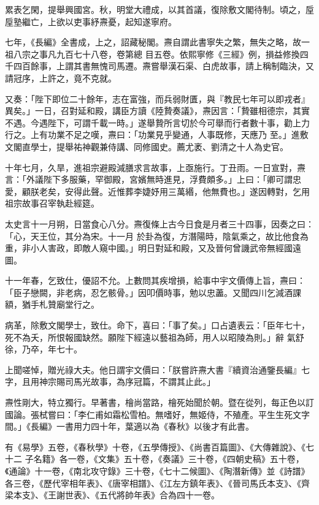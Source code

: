 \begin{pinyinscope}
 累表乞閑，提舉興國宮。秋，明堂大禮成，以其首議，復除敷文閣待制。頃之，垕垕塾繼亡，上欲以吏事紓燾憂，起知遂寧府。



 七年，《長編》全書成，上之，詔藏秘閣。燾自謂此書寧失之繁，無失之略，故一祖八宗之事凡九百七十八卷，卷第總
 目五卷。依熙寧修《三經》例，損益修換四千四百餘事，上謂其書無愧司馬遷。燾嘗舉漢石渠、白虎故事，請上稱制臨決，又請冠序，上許之，竟不克就。



 又奏：「陛下即位二十餘年，志在富強，而兵弱財匱，與『教民七年可以即戎者』異矣。」一日，召對延和殿，講臣方讀《陸贄奏議》，燾因言：「贄雖相德宗，其實不遇。今遇陛下，可謂千載一時。」遂舉贄所言切於今可舉而行者數十事，勸上力行之。上有功業不足之嘆，燾曰：「功業見乎變通，人事既修，天應乃
 至。」進敷文閣直學士，提舉祐神觀兼侍講、同修國史。薦尤袤、劉清之十人為史官。



 十年七月，久旱，進祖宗避殿減膳求言故事，上亟施行。丁丑雨。一日宣對，燾言：「外議陛下多服藥，罕御殿，宮嬪無時進見，浮費頗多。」上曰：「卿可謂忠愛，顧朕老矣，安得此聲。近惟葬李婕妤用三萬緡，他無費也。」遂因轉對，乞用祖宗故事召宰執赴經筵。



 太史言十一月朔，日當食心八分。燾復條上古今日食是月者三十四事，因奏之曰：「心，天王位，其分為宋。十一月
 於卦為復，方潛陽時，陰氣乘之，故比他食為重，非小人害政，即敵人窺中國。」明日對延和殿，又及晉何曾譏武帝無經國遠圖。



 十一年春，乞致仕，優詔不允。上數問其疾增損，給事中宇文價傳上旨，燾曰：「臣子戀闕，非老病，忍乞骸骨。」因叩價時事，勉以忠藎。又聞四川乞減酒課額，猶手札贊廟堂行之。



 病革，除敷文閣學士，致仕。命下，喜曰：「事了矣。」口占遺表云：「臣年七十，死不為夭，所恨報國缺然。願陛下經遠以藝祖為師，用人以昭陵為則。」辭
 氣舒徐，乃卒，年七十。



 上聞嗟悼，贈光祿大夫。他日謂宇文價曰：「朕嘗許燾大書『續資治通鑒長編』七字，且用神宗賜司馬光故事，為序冠篇，不謂其止此。」



 燾性剛大，特立獨行。早著書，檜尚當路，檜死始聞於朝。暨在從列，每正色以訂國論。張栻嘗曰：「李仁甫如霜松雪柏。無嗜好，無姬侍，不殖產。平生生死文字間。」《長編》一書用力四十年，葉適以為《春秋》以後才有此書。



 有《易學》五卷，《春秋學》十卷，《五學傳授》、《尚書百篇圖》、《大傳雜說》、《七十二
 子名籍》各一卷，《文集》五十卷，《奏議》三十卷，《四朝史稿》五十卷，《通論》十一卷，《南北攻守錄》三十卷，《七十二候圖》、《陶潛新傳》並《詩譜》各三卷，《歷代宰相年表》、《唐宰相譜》、《江左方鎮年表》、《晉司馬氏本支》、《齊梁本支》、《王謝世表》、《五代將帥年表》合為四十一卷。




\end{pinyinscope}
